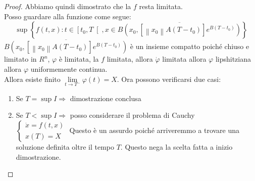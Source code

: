 \begin{proof}
	Abbiamo quindi dimostrato che la $f$ resta limitata.\\
	Posso guardare alla funzione come segue:\\
	$$
	\sup
	\left\{f(t,x): t\in\left[t_0,T\right[, x\in \overline{B\left(x_0,
		\left[ 
			\left\|x_0\right\| A \left(T-t_0\right)
		\right]e^{B\left(T-t_0\right)}\right)}
	\right\}
	$$
	$\overline{B\left(x_0,
		\left[ 
		\left\|x_0\right\| A \left(T-t_0\right)
		\right]e^{B\left(T-t_0\right)}\right)}
	$ è un insieme compatto poiché chiuso e limitato in $R^n$, $\varphi$ è limitata, la $f$ limitata, allora $\dot{\varphi}$ limitata allora $\varphi$ lipshitziana allora $\varphi$ uniformemente continua.\\
		Allora esiste finito $\lim\limits_{t\to T^{-}}\varphi(t)=X$. Ora possono verificarsi due casi:\\
	\begin{enumerate}
		\item Se $T=\sup I \Rightarrow$ dimostrazione conclusa
		\item Se $T<\sup I \Rightarrow$ posso considerare il problema di Cauchy \\
		$\left\{ \begin{matrix} \dot{x}=f(t,x)\\x(T)=X \end{matrix} \right.$ Questo è un assurdo poiché arriveremmo a trovare una soluzione definita oltre il tempo $T$. Questo nega la scelta fatta a inizio dimostrazione.
		\end{enumerate}
\end{proof}
